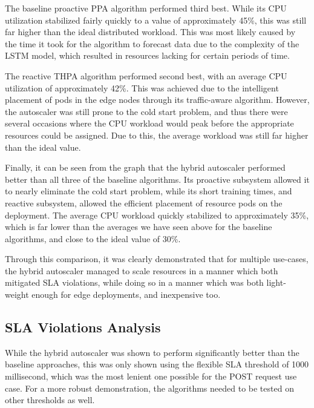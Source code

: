 The baseline proactive PPA algorithm performed third best. While its CPU utilization stabilized fairly quickly to a value of approximately 45\%, this was still far higher than the ideal distributed workload. This was most likely caused by the time it took for the algorithm to forecast data due to the complexity of the LSTM model, which resulted in resources lacking for certain periods of time.\par

The reactive THPA algorithm performed second best, with an average CPU utilization of approximately 42\%. This was achieved due to the intelligent placement of pods in the edge nodes through its traffic-aware algorithm. However, the autoscaler was still prone to the cold start problem, and thus there were several occasions where the CPU workload would peak before the appropriate resources could be assigned. Due to this, the average workload was still far higher than the ideal value.\par

Finally, it can be seen from the graph that the hybrid autoscaler performed better than all three of the baseline algorithms. Its proactive subsystem allowed it to nearly eliminate the cold start problem, while its short training times, and reactive subsystem, allowed the efficient placement of resource pods on the deployment. The average CPU workload quickly stabilized to approximately 35\%, which is far lower than the averages we have seen above for the baseline algorithms, and close to the ideal value of 30\%.\par

Through this comparison, it was clearly demonstrated that for multiple use-cases, the hybrid autoscaler managed to scale resources in a manner which both mitigated SLA violations, while doing so in a manner which was both light-weight enough for edge deployments, and inexpensive too.\par

\subsection{SLA Violations Analysis}
\label{subsec:ch5-exp2-sla-violations}

While the hybrid autoscaler was shown to perform significantly better than the baseline approaches, this was only shown using the flexible SLA threshold of 1000 millisecond, which was the most lenient one possible for the POST request use case. For a more robust demonstration, the algorithms needed to be tested on other thresholds as well.\par

